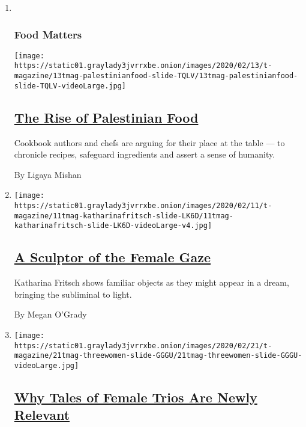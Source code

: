 \begin{enumerate}
\def\labelenumi{\arabic{enumi}.}
\item ~
  \hypertarget{food-matters}{%
  \subsubsection{Food Matters}\label{food-matters}}

  \texttt{[image: https://static01.graylady3jvrrxbe.onion/images/2020/02/13/t-magazine/13tmag-palestinianfood-slide-TQLV/13tmag-palestinianfood-slide-TQLV-videoLarge.jpg]}

  \hypertarget{the-rise-of-palestinian-food}{%
  \subsection{\texorpdfstring{\href{/2020/02/12/t-magazine/palestinian-food.html}{The
  Rise of Palestinian
  Food}}{The Rise of Palestinian Food}}\label{the-rise-of-palestinian-food}}

  Cookbook authors and chefs are arguing for their place at the table
  --- to chronicle recipes, safeguard ingredients and assert a sense of
  humanity.

  By Ligaya Mishan
\item
  \texttt{[image: https://static01.graylady3jvrrxbe.onion/images/2020/02/11/t-magazine/11tmag-katharinafritsch-slide-LK6D/11tmag-katharinafritsch-slide-LK6D-videoLarge-v4.jpg]}

  \hypertarget{a-sculptor-of-the-female-gaze}{%
  \subsection{\texorpdfstring{\href{/2020/02/12/t-magazine/katharina-fritsch-artist.html}{A
  Sculptor of the Female
  Gaze}}{A Sculptor of the Female Gaze}}\label{a-sculptor-of-the-female-gaze}}

  Katharina Fritsch shows familiar objects as they might appear in a
  dream, bringing the subliminal to light.

  By Megan O'Grady
\item
  \texttt{[image: https://static01.graylady3jvrrxbe.onion/images/2020/02/21/t-magazine/21tmag-threewomen-slide-GGGU/21tmag-threewomen-slide-GGGU-videoLarge.jpg]}

  \hypertarget{why-tales-of-female-trios-are-newly-relevant}{%
  \subsection{\texorpdfstring{\href{/2020/02/19/t-magazine/female-trios.html}{Why
  Tales of Female Trios Are Newly
  Relevant}}{Why Tales of Female Trios Are Newly Relevant}}\label{why-tales-of-female-trios-are-newly-relevant}}


\end{enumerate}
